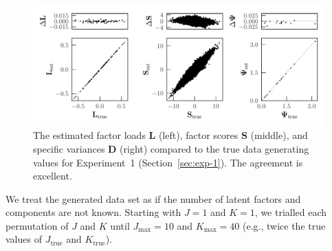 \documentclass[twocolumn]{aastex62}
\newcommand{\vect}[1]{\boldsymbol{\mathbf{#1}}}
\renewcommand{\vec}[1]{\vect{#1}}
\newcommand{\factorloads}{\textbf{L}}
\newcommand{\factorscores}{\textbf{S}}
\newcommand{\specificvariance}{\vec{D}}
\newcommand{\NumLatentFactors}{J}
\newcommand{\NumComponents}{K}
\begin{document}
\begin{figure}[t!]
	\includegraphics[width=\textwidth]{experiments/exp1-compare-all.pdf}
    \caption{The estimated factor loads $\factorloads$ (left), factor scores $\factorscores$ (middle),
    		 and specific variances $\specificvariance$ (right) compared to the 
		 	 true data generating values
		 	 for Experiment~1 (Section~\ref{sec:exp-1}). The agreement is excellent.}
    \label{fig:exp1-compare}
\end{figure}



We treat the generated data set as if the number of latent factors
and components are not known. Starting with $\NumLatentFactors = 1$
and $\NumComponents = 1$, we trialled each permutation of $\NumLatentFactors$ and $\NumComponents$
until $\NumLatentFactors_\textrm{max} = 10$
and   $\NumComponents_\textrm{max} = 40$ (e.g., twice the true values of $\NumLatentFactors_\textrm{true}$ and $\NumComponents_\textrm{true}$).
\end{document}
